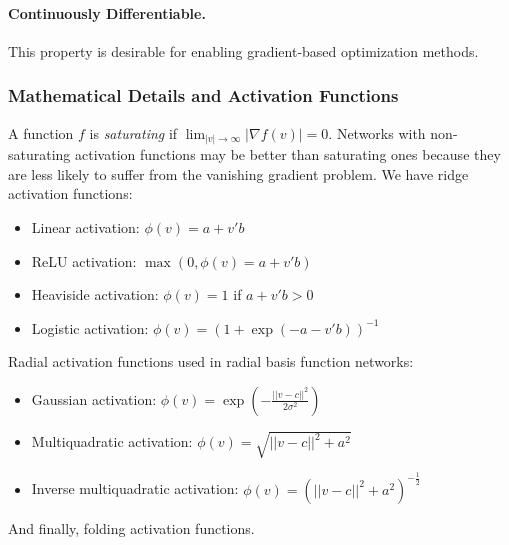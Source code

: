 \documentclass{article}
\begin{document}
\paragraph{Continuously Differentiable.} This property is desirable for enabling gradient-based optimization methods.

\subsubsection{Mathematical Details and Activation Functions}
A function $f$ is \textit{saturating} if $\lim_{|v|\to \infty}|\nabla f(v)| = 0$. Networks with non-saturating activation
functions may be better than saturating ones because they are less likely to suffer from the vanishing gradient problem. 
We have ridge activation functions:
\begin{itemize}
	\item Linear activation: $\phi(v)=a+v'b$
	\item ReLU activation: $\max(0, \phi(v)=a+v'b)$
	\item Heaviside activation: $\phi(v)=1$ if $a+v'b>0$
	\item Logistic activation: $\phi(v)=(1+\exp(-a-v'b))^{-1}$
\end{itemize}

\noindent Radial activation functions used in radial basis function networks:
\begin{itemize}
	\item Gaussian activation: $\phi(v)=\exp\left(-\frac{||v-c||^2}{2\sigma^2}\right)$
	\item Multiquadratic activation: $\phi(v)=\sqrt{||v-c||^2+a^2}$
	\item Inverse multiquadratic activation: $\phi(v)=\left(||v-c||^2+a^2\right)^{-\frac{1}{2}}$
\end{itemize}
\noindent And finally, folding activation functions.

\pagebreak
\end{document}
